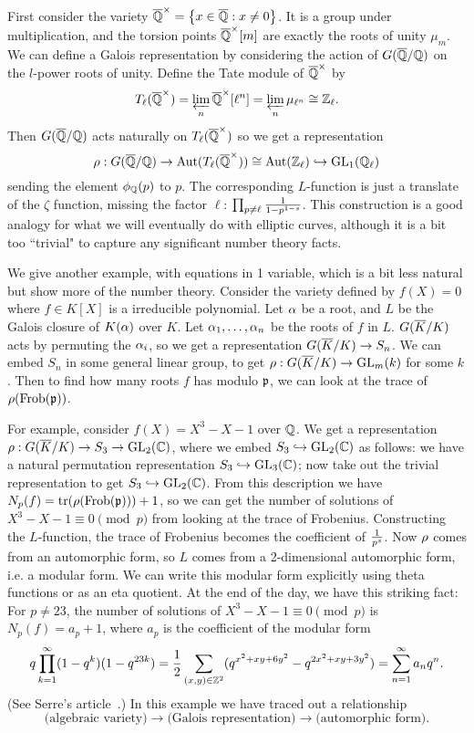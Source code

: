 First consider the variety $\overline{\mathbb{Q}}^{\times}=\left\{{x\in \overline{\mathbb{Q}}}:{x\ne 0}\right\}$. It is a group under multiplication, and the torsion points $\overline{\mathbb{Q}}^{\times}[m]$ are exactly the roots of unity $\mu_m$. We can define a Galois representation by considering the action of $G(\overline{\mathbb{Q}}/\mathbb{Q})$ on the $l$-power roots of unity. Define the Tate module of $\overline{\mathbb{Q}}^{\times}$ by
\[
T_{\ell}(\overline{\mathbb{Q}}^{\times})=\varprojlim_n\overline{\mathbb{Q}}^{\times}[\ell^n]=\varprojlim_n \mu_{\ell^n}\cong \mathbb{Z}_{\ell}.
\]
Then $G(\overline{\mathbb{Q}}/\mathbb{Q})$ acts naturally on $T_{\ell}(\overline{\mathbb{Q}}^{\times})$ so we get a representation
\[
\rho:G(\overline{\mathbb{Q}}/\mathbb{Q})\to \operatorname{Aut}(T_{\ell}(\overline{\mathbb{Q}}^{\times}))\cong \operatorname{Aut}(\mathbb{Z}_{\ell})\hookrightarrow \operatorname{GL}_1(\mathbb{Q}_{\ell})
\]
sending the element $\phi_{\mathbb{Q}}(p)$ to $p$. The corresponding $L$-function is just a translate of the $\zeta$ function, missing the factor $\ell$: $\prod_{p\ne \ell}\frac{1}{1-p^{1-s}}$. 
This construction is a good analogy for what we will eventually do with elliptic curves, although it is a bit too ``trivial" to capture any significant number theory facts.

We give another example, with equations in 1 variable, which is a bit less natural but show more of the number theory. Consider the variety defined by $f(X)=0$ where $f\in K[X]$ is a irreducible polynomial. Let $\alpha$ be a root, and $L$ be the Galois closure of $K(\alpha)$ over $K$. Let $\alpha_1,\ldots, \alpha_n$ be the roots of $f$ in $L$. $G(\overline{K}/K)$ acts by permuting the $\alpha_i$, so we get a representation $G(\overline{K}/K)\to S_n$. We can embed $S_n$ in some general linear group, to get $\rho:G(\overline{K}/K)\to \operatorname{GL}_m(k)$ for some $k$. Then to find how many roots $f$ has modulo $\mathfrak{p}$, we can look at the trace of $\rho(\operatorname{Frob}(\mathfrak{p}))$.

For example, consider $f(X)=X^3-X-1$ over $\mathbb{Q}$. We get a representation $\rho:G(\overline{K}/K)\to S_3\to \operatorname{GL}_2(\mathbb{C})$, where we embed $S_3\hookrightarrow \operatorname{GL}_2(\mathbb{C})$ as follows: we have a natural permutation representation $S_3\hookrightarrow \operatorname{GL}_3(\mathbb{C})$; now take out the trivial representation to get $S_3\hookrightarrow \operatorname{GL}_2(\mathbb{C})$. From this description we have $N_p(f)=\operatorname{tr}(\rho(\operatorname{Frob}(\mathfrak{p})))+1$, so we can get the number of solutions of $X^3-X-1\equiv 0\pmod p$ from looking at the trace of Frobenius. Constructing the $L$-function, the trace of Frobenius becomes the coefficient of $\frac{1}{p^{s}}$. Now $\rho$ comes from an automorphic form, so $L$ comes from a 2-dimensional automorphic form, i.e. a modular form. We can write this modular form explicitly using theta functions or as an eta quotient. At the end of the day, we have this striking fact: For $p\ne 23$, the number of solutions of $X^3-X-1\equiv 0\pmod{p}$ is $N_p(f)=a_p+1$, where $a_p$ is the coefficient of the modular form
\[
q\prod_{k=1}^{\infty}(1-q^k)(1-q^{23k})=\frac{1}{2}\sum_{(x,y)\in \mathbb{Z}^2}(q^{x^2+xy+6y^2}-q^{2x^2+xy+3y^2})=\sum_{n=1}^{\infty}a_nq^n.
\]
(See Serre's article~\cite{Se03}.) In this example we have traced out a relationship 
\[\text{(algebraic variety)$\to$(Galois representation)$\to$(automorphic form).}\]
